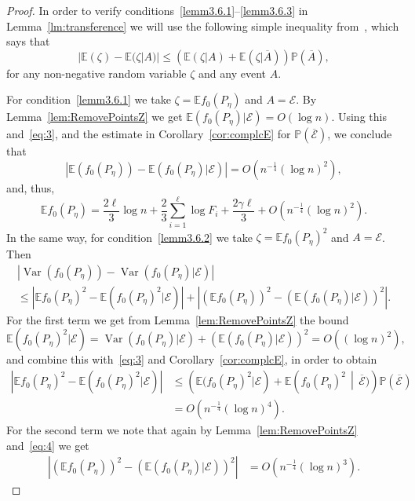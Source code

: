 \documentclass[AHL,Unicode,longabstracts,published]{cedram}
\newcommand{\var}{\operatorname{Var}}
\newcommand{\bbE}{\mathbb{E}}
\newcommand{\bbP}{\mathbb{P}}
\newcommand{\clE}{\mathcal{E}}
\begin{document}
\begin{proof}
In order to verify conditions~\eqref{lemm3.6.1}--\eqref{lemm3.6.3} in Lemma~\ref{lm:transference} we will use the following simple inequality from~\cite[Claim~8.3]{BR10}, which says that
\[
|\bbE(\zeta)-\bbE(\zeta|A)|\leq \left(\bbE(\zeta|A)+\bbE(\zeta|\overline{A})\right)\bbP(\overline{A}),
\]
for any non-negative random variable $\zeta$ and any event $A$.

For condition~\eqref{lemm3.6.1} we take $\zeta = \bbE f_0(P_{\eta})$ and $A=\clE$. By Lemma~\ref{lem:RemovePointsZ} we get $ \bbE (f_0(P_{\eta})|\clE) = O(\log n)$. Using this and~\eqref{eq:3}, and the estimate in Corollary~\ref{cor:complcE} for $\bbP (\overline{\clE})$, we conclude that
\begin{equation}\label{eq:4}
\left|\bbE\left(f_0(P_{\eta})\right)-\bbE\left(f_0(P_{\eta})|\clE\right)\right| = O\left(n^{-\frac 14}(\log n)^2\right),
\end{equation}
and, thus,
\begin{equation}\label{eq:EE-Poiss}
\bbE f_0(P_{\eta}) = \frac{2 \ell}{3}\log n + \frac 23 \sum_{i=1}^\ell \log F_i + \frac{2 \gamma \ell }3 + O\left(n^{-\frac 14}(\log n)^2\right).
\end{equation}
In the same way, for condition~\eqref{lemm3.6.2} we take $\zeta =\bbE f_0(P_{\eta})^2$ and $A=\clE$. Then
\begin{multline*}
\left|\var(f_0(P_{\eta}))-\var(f_0(P_{\eta})|\clE)\right|\\
\leq \left|\bbE f_0(P_{\eta})^2-\bbE\left(f_0(P_{\eta})^2|\clE\right)\right| +\left|\left(\bbE f_0(P_{\eta})\right)^2-\left(\bbE(f_0(P_{\eta})|\clE)\right)^2\right|.
\end{multline*}
For the first term we get from Lemma~\ref{lem:RemovePointsZ} the bound
\[
\bbE\left(f_0(P_{\eta})^2|\clE\right) =
\var (f_0(P_{\eta})|\clE) + (\bbE (f_0(P_{\eta})|\clE))^2 = O\left((\log n)^2\right),
\]
and combine this with~\eqref{eq:3} and Corollary~\ref{cor:complcE}, in order to obtain
\begin{align*}
\left|\bbE f_0(P_{\eta})^2-\bbE\left(f_0(P_{\eta})^2|\clE\right)\right|&\leq \left(\bbE(f_0(P_{\eta})^2|\clE\right)+\bbE\left(f_0(P_{\eta})^2\,\middle|\,\overline{\clE})\right)\bbP(\overline{\clE})\\
& = O\left(n^{-\frac 14}(\log n)^4\right).
\end{align*}
For the second term we note that again by Lemma~\ref{lem:RemovePointsZ} and~\eqref{eq:4} we get
\begin{align*}
\left|\left(\bbE f_0(P_{\eta})\right)^2-\left(\bbE(f_0(P_{\eta})|\clE)\right)^2\right| & = O\left(n^{-\frac 14} (\log n)^3\right).

\end{align*}
\end{proof}
\end{document}

